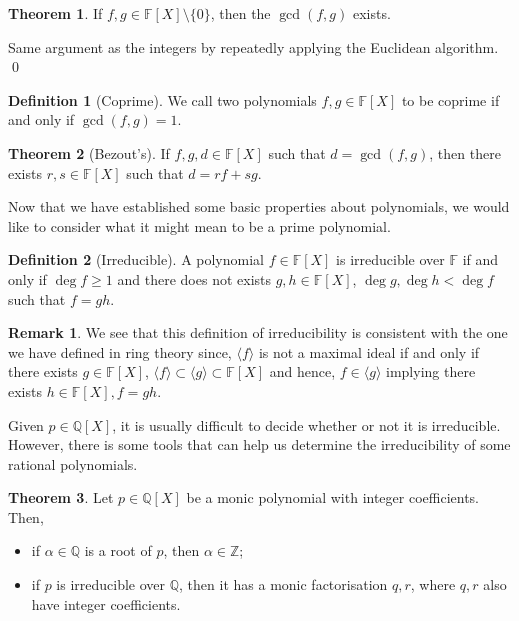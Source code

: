 \documentclass[
]{article}
\theoremstyle{definition}
\newtheorem{theorem}{Theorem}
\newtheorem*{remark}{Remark}
\theoremstyle{definition}
\newtheorem{definition}{Definition}[section]
\begin{document}
\begin{theorem}
  If \(f, g \in \mathbb{F}[X] \setminus \{0\}\), then the \(\gcd(f, g)\) exists.
\end{theorem}
\proof

Same argument as the integers by repeatedly applying the Euclidean
algorithm. \qed

\begin{definition}[Coprime]
  We call two polynomials \(f, g \in \mathbb{F}[X]\) to be coprime if and only if
  \(\gcd(f, g) = 1\).
\end{definition}

\begin{theorem}[Bezout's]
  If \(f, g, d \in \mathbb{F}[X]\) such that \(d = \gcd(f, g)\), then there 
  exists \(r, s \in \mathbb{F}[X]\) such that \(d = r f + s g\).
\end{theorem}

Now that we have established some basic properties about polynomials, we
would like to consider what it might mean to be a prime polynomial.

\begin{definition}[Irreducible]
  A polynomial \(f \in \mathbb{F}[X]\) is irreducible over \(\mathbb{F}\) if 
  and only if \(\deg f \ge 1\) and there does not exists 
  \(g, h \in \mathbb{F}[X]\), \(\deg g, \deg h < \deg f\) such that \(f = gh\). 
\end{definition}
\begin{remark}
  We see that this definition of irreducibility is consistent with the one we 
  have defined in ring theory since, \(\langle f \rangle\) is not a maximal 
  ideal if and only if there exists \(g \in \mathbb{F}[X]\), 
  \(\langle f \rangle \subset \langle g \rangle \subset \mathbb{F}[X]\) and 
  hence, \(f \in \langle g \rangle\) implying there exists 
  \(h \in \mathbb{F}[X], f = gh\).
\end{remark}

Given \(p \in \mathbb{Q}[X]\), it is usually difficult to decide whether
or not it is irreducible. However, there is some tools that can help us
determine the irreducibility of some rational polynomials.

\begin{theorem}
  Let \(p \in \mathbb{Q}[X]\) be a monic polynomial with integer coefficients.
  Then, 
  \begin{itemize}
    \item if \(\alpha \in \mathbb{Q}\) is a root of \(p\), then 
      \(\alpha \in \mathbb{Z}\);
    \item if \(p\) is irreducible over \(\mathbb{Q}\), then it has a monic
      factorisation \(q, r\), where \(q, r\) also have integer coefficients. 
  \end{itemize}
\end{theorem}
\proof
\end{document}
